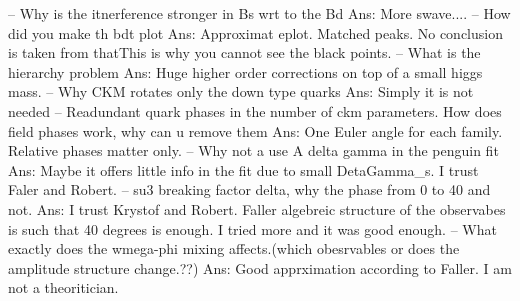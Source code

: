 
-- Why is the itnerference stronger in Bs wrt to the Bd
   Ans: More swave....
-- How did you make th bdt plot
   Ans: Approximat eplot. Matched peaks. No conclusion is taken from thatThis is why you cannot see the black points.
-- What is the hierarchy problem
   Ans: Huge higher order corrections on top of a small higgs mass.
-- Why CKM rotates only the down type quarks
   Ans: Simply it is not needed
-- Readundant quark phases in the number of ckm parameters. How does field phases work, why can u remove them
   Ans: One Euler angle for each family. Relative phases matter only.
-- Why not a use A delta gamma in the penguin fit
   Ans: Maybe it offers little info in the fit due to small DetaGamma_s. I trust Faler and Robert.
-- su3 breaking factor delta, why the phase from 0 to 40 and not.
   Ans: I trust Krystof and Robert. Faller algebreic structure of the observabes is such that 40 degrees is enough. I tried more and it was good enough.
-- What exactly does the wmega-phi mixing affects.(which obesrvables or does the amplitude structure change.??)
   Ans: Good apprximation according to Faller. I am not a theoritician.
